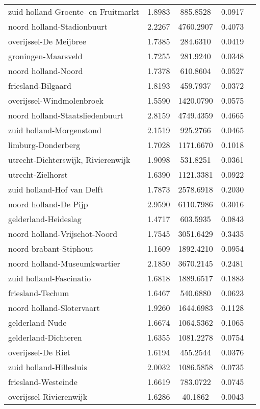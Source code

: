 \begin{longtable}{llccc}
zuid holland-Groente- en Fruitmarkt & 1.8983 & 885.8528 & 0.0917 \\
noord holland-Stadionbuurt & 2.2267 & 4760.2907 & 0.4073 \\
overijssel-De Meijbree & 1.7385 & 284.6310 & 0.0419 \\
groningen-Maarsveld & 1.7255 & 281.9240 & 0.0348 \\
noord holland-Noord & 1.7378 & 610.8604 & 0.0527 \\
friesland-Bilgaard & 1.8193 & 459.7937 & 0.0372 \\
overijssel-Windmolenbroek & 1.5590 & 1420.0790 & 0.0575 \\
noord holland-Staatsliedenbuurt & 2.8159 & 4749.4359 & 0.4665 \\
zuid holland-Morgenstond & 2.1519 & 925.2766 & 0.0465 \\
limburg-Donderberg & 1.7028 & 1171.6670 & 0.1018 \\
utrecht-Dichterswijk, Rivierenwijk & 1.9098 & 531.8251 & 0.0361 \\
utrecht-Zielhorst & 1.6390 & 1121.3381 & 0.0922 \\
zuid holland-Hof van Delft & 1.7873 & 2578.6918 & 0.2030 \\
noord holland-De Pijp & 2.9590 & 6110.7986 & 0.3016 \\
gelderland-Heideslag & 1.4717 & 603.5935 & 0.0843 \\
noord holland-Vrijschot-Noord & 1.7545 & 3051.6429 & 0.3435 \\
noord brabant-Stiphout & 1.1609 & 1892.4210 & 0.0954 \\
noord holland-Museumkwartier & 2.1850 & 3670.2145 & 0.2481 \\
zuid holland-Fascinatio & 1.6818 & 1889.6517 & 0.1883 \\
friesland-Techum & 1.6467 & 540.6880 & 0.0623 \\
noord holland-Slotervaart & 1.9260 & 1644.6983 & 0.1128 \\
gelderland-Nude & 1.6674 & 1064.5362 & 0.1065 \\
gelderland-Dichteren & 1.6355 & 1081.2278 & 0.0754 \\
overijssel-De Riet & 1.6194 & 455.2544 & 0.0376 \\
zuid holland-Hillesluis & 2.0032 & 1086.5858 & 0.0735 \\
friesland-Westeinde & 1.6619 & 783.0722 & 0.0745 \\
overijssel-Rivierenwijk & 1.6286 & 40.1862 & 0.0043 \\

\end{longtable}
